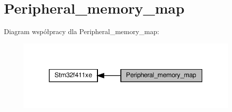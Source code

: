 \hypertarget{group___peripheral__memory__map}{}\section{Peripheral\+\_\+memory\+\_\+map}
\label{group___peripheral__memory__map}
Diagram współpracy dla Peripheral\+\_\+memory\+\_\+map\+:\nopagebreak
\begin{figure}[H]
\begin{center}
\leavevmode
\includegraphics[width=315pt]{group___peripheral__memory__map}
\end{center}
\end{figure}
